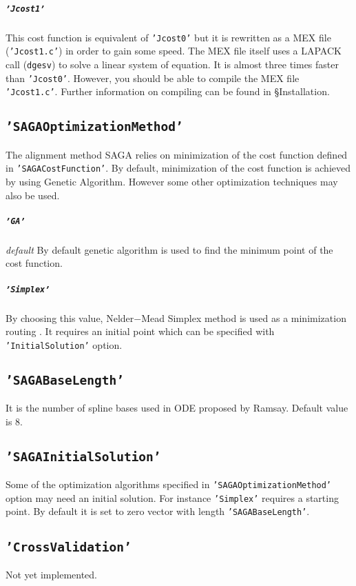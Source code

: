 \documentclass{article}
\newcommand{\parametre}[1]{\texttt{#1}}
\newcommand{\matlabfile}[1]{}
\begin{document}
\begin{scriptsize}
\matlabfile{tscu_manual_verbatim03.out}
\end{scriptsize}

\subparagraph*{\parametre{'Jcost1'}} This cost function is equivalent of \parametre{'Jcost0'} but it is rewritten as a MEX file (\parametre{'Jcost1.c'}) in order to gain some speed. The MEX file itself uses a LAPACK call (\parametre{dgesv}) to solve a linear system of equation. It is almost three times faster than \parametre{'Jcost0'}. However, you should be able to compile the MEX file \parametre{'Jcost1.c'}. Further information on compiling can be found in \S Installation.

\subsection{\parametre{'SAGAOptimizationMethod'}}
The alignment method SAGA relies on minimization of the cost function defined in \parametre{'SAGACostFunction'}. By default, minimization of the cost function is achieved by using Genetic Algorithm. However some other optimization techniques may also be used.

\subparagraph*{\parametre{'GA'}} \textit{default} 
By default genetic algorithm is used to find the minimum point of the cost function.

\subparagraph*{\parametre{'Simplex'}} By choosing this value, Nelder$-$Mead Simplex method is used as a minimization routing \cite{Lagarias1998}. It requires an initial point which can be specified with \parametre{'InitialSolution'} option.

\subsection{\parametre{'SAGABaseLength'}} 
It is the number of spline bases used in ODE proposed by Ramsay. Default value is $8$.

\subsection{\parametre{'SAGAInitialSolution'}}
Some of the optimization algorithms specified in \parametre{'SAGAOptimizationMethod'} option may need an initial solution. For instance \parametre{'Simplex'} requires a starting point. By default it is set to zero vector with length \parametre{'SAGABaseLength'}.

\subsection{\parametre{'CrossValidation'}}
Not yet implemented.
\end{document}
